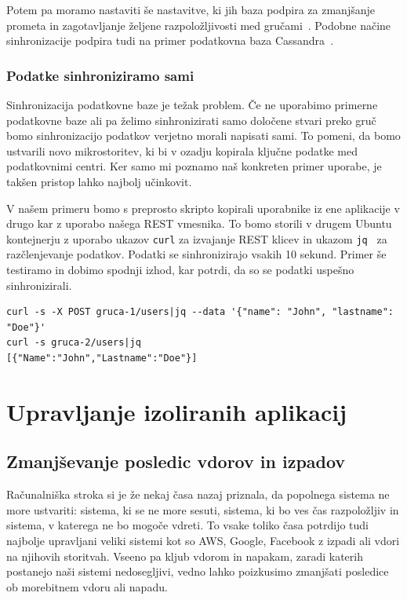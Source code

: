 \documentclass[a4paper, 12pt]{book}
\begin{document}
Potem pa moramo nastaviti še nastavitve, ki jih baza podpira za zmanjšanje prometa in zagotavljanje željene razpoložljivosti med gručami~\cite{cratedb-zone}.
Podobne načine sinhronizacije podpira tudi na primer podatkovna baza Cassandra~\cite{cassandra-zone}.
\subsection{Podatke sinhroniziramo sami}
Sinhronizacija podatkovne baze je težak problem.
Če ne uporabimo primerne podatkovne baze ali pa želimo sinhronizirati samo določene stvari preko gruč bomo sinhronizacijo podatkov verjetno morali napisati sami.
To pomeni, da bomo ustvarili novo mikrostoritev, ki bi v ozadju kopirala ključne podatke med podatkovnimi centri.
Ker samo mi poznamo naš konkreten primer uporabe, je takšen pristop lahko najbolj učinkovit.

V našem primeru bomo s preprosto skripto kopirali uporabnike iz ene aplikacije v drugo kar z uporabo našega REST vmesnika.
To bomo storili v drugem Ubuntu kontejnerju z uporabo ukazov \verb|curl| za izvajanje REST klicev in ukazom \verb|jq|~\cite{jq} za razčlenjevanje podatkov.
Podatki se sinhronizirajo vsakih 10 sekund.
Primer še testiramo in dobimo spodnji izhod, kar potrdi, da so se podatki uspešno sinhronizirali.
\begin{verbatim}
curl -s -X POST gruca-1/users|jq --data '{"name": "John", "lastname": "Doe"}'
curl -s gruca-2/users|jq
[{"Name":"John","Lastname":"Doe"}]
\end{verbatim}
\chapter{Upravljanje izoliranih aplikacij}
\section{Zmanjševanje posledic vdorov in izpadov}
  Računalniška stroka si je že nekaj časa nazaj priznala, da popolnega sistema ne more ustvariti: sistema, ki se ne more sesuti, sistema, ki bo ves čas razpoložljiv in sistema, v katerega ne bo mogoče vdreti.
To vsake toliko časa potrdijo tudi najbolje upravljani veliki sistemi kot so AWS, Google, Facebook z izpadi ali vdori na njihovih storitvah. 
Vseeno pa kljub vdorom in napakam, zaradi katerih postanejo naši sistemi nedosegljivi, vedno lahko poizkusimo zmanjšati posledice ob morebitnem vdoru ali napadu. 
\end{document}
